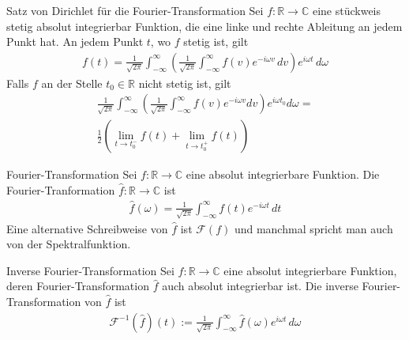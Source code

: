 \documentclass[a4paper,10pt]{article}
\begin{document}
\begin{subbox}{Satz von Dirichlet für die Fourier-Transformation}
  Sei \(f\colon\mathbb{R}\to\mathbb{C}\) eine stückweis stetig absolut integrierbar Funktion, die eine linke und rechte Ableitung an jedem Punkt hat. An jedem Punkt \(t\), wo \(f\) stetig ist, gilt \begin{align*} f(t)=\frac{1}{\sqrt{2\pi}}\int_{-\infty }^\infty \left(\frac{1}{\sqrt{2\pi}}\int_{-\infty}^\infty f(v )e^{- i \omega v }\,dv \right)e^{ i \omega t}\,d\omega \end{align*} Falls \(f\) an der Stelle \(t_0\in\mathbb{R}\) nicht stetig ist, gilt 
  \begin{align*} 
    \frac{1}{\sqrt{2\pi}}\int_{-\infty }^\infty \left(\frac{1}{\sqrt{2\pi}}\int_{-\infty}^\infty f(v )e^{- i \omega v } dv \right)e^{ i \omega t_0} d\omega =\\
    \frac12\left(\lim_{t\to t_0^-}f(t)+\lim_{t\to t_0^+}f(t)\right) \end{align*}
\end{subbox}

\begin{mainbox}{Fourier-Transformation}
  Sei \(f\colon\mathbb{R}\to\mathbb{C}\) eine absolut integrierbare Funktion. Die Fourier-Tranformation \(\hat f\colon\mathbb{R}\to\mathbb{C}\) ist \begin{align*} \hat f(\omega)=\frac{1}{\sqrt{2\pi}}\int_{-\infty}^\infty f(t)e^{- i\omega t}\,dt \end{align*} Eine alternative Schreibweise von \(\hat f\) ist \(\mathcal F(f)\) und manchmal spricht man auch von der Spektralfunktion.
\end{mainbox}

\begin{mainbox}{Inverse Fourier-Transformation}
  Sei \(f\colon\mathbb{R}\to\mathbb{C}\) eine absolut integrierbare Funktion, deren Fourier-Transformation \(\hat f\) auch absolut integrierbar ist. Die inverse Fourier-Transformation von \(\hat f\) ist \begin{align*} \mathcal F^{-1}(\hat f)(t):=\frac{1}{\sqrt{2\pi}}\int_{-\infty}^\infty \hat f(\omega)e^{ i\omega t}\,d\omega \end{align*}
\end{mainbox}
\end{document}
